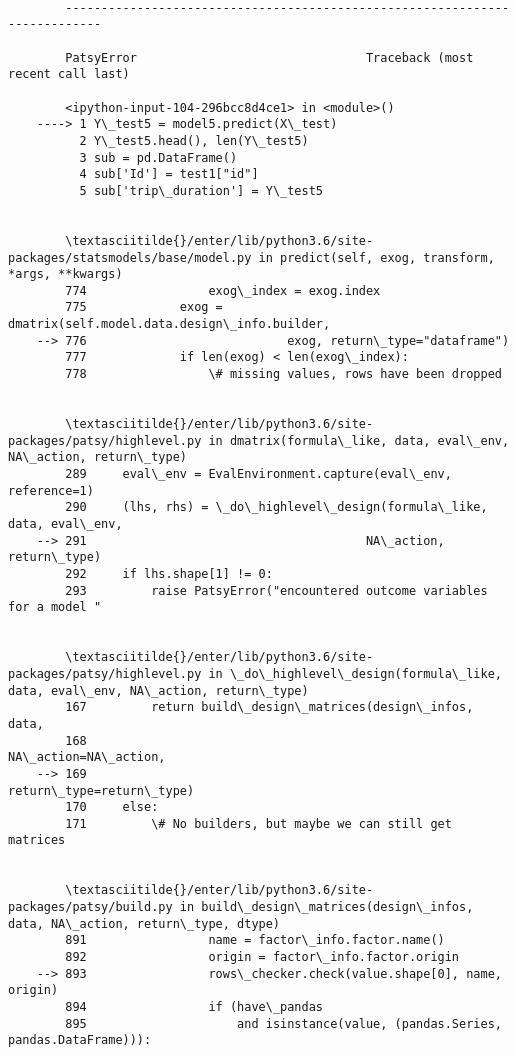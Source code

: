 \documentclass[11pt]{article}
\begin{document}
    \begin{Verbatim}[commandchars=\\\{\}]

        ---------------------------------------------------------------------------

        PatsyError                                Traceback (most recent call last)

        <ipython-input-104-296bcc8d4ce1> in <module>()
    ----> 1 Y\_test5 = model5.predict(X\_test)
          2 Y\_test5.head(), len(Y\_test5)
          3 sub = pd.DataFrame()
          4 sub['Id'] = test1["id"]
          5 sub['trip\_duration'] = Y\_test5


        \textasciitilde{}/enter/lib/python3.6/site-packages/statsmodels/base/model.py in predict(self, exog, transform, *args, **kwargs)
        774                 exog\_index = exog.index
        775             exog = dmatrix(self.model.data.design\_info.builder,
    --> 776                            exog, return\_type="dataframe")
        777             if len(exog) < len(exog\_index):
        778                 \# missing values, rows have been dropped


        \textasciitilde{}/enter/lib/python3.6/site-packages/patsy/highlevel.py in dmatrix(formula\_like, data, eval\_env, NA\_action, return\_type)
        289     eval\_env = EvalEnvironment.capture(eval\_env, reference=1)
        290     (lhs, rhs) = \_do\_highlevel\_design(formula\_like, data, eval\_env,
    --> 291                                       NA\_action, return\_type)
        292     if lhs.shape[1] != 0:
        293         raise PatsyError("encountered outcome variables for a model "


        \textasciitilde{}/enter/lib/python3.6/site-packages/patsy/highlevel.py in \_do\_highlevel\_design(formula\_like, data, eval\_env, NA\_action, return\_type)
        167         return build\_design\_matrices(design\_infos, data,
        168                                      NA\_action=NA\_action,
    --> 169                                      return\_type=return\_type)
        170     else:
        171         \# No builders, but maybe we can still get matrices


        \textasciitilde{}/enter/lib/python3.6/site-packages/patsy/build.py in build\_design\_matrices(design\_infos, data, NA\_action, return\_type, dtype)
        891                 name = factor\_info.factor.name()
        892                 origin = factor\_info.factor.origin
    --> 893                 rows\_checker.check(value.shape[0], name, origin)
        894                 if (have\_pandas
        895                     and isinstance(value, (pandas.Series, pandas.DataFrame))):



\end{Verbatim}
\end{document}
